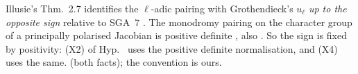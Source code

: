 \begin{remark}\label{rem:s05-illusie}
Illusie's Thm.~2.7 identifies the $\ell$-adic pairing with Grothendieck's $u_\ell$ \emph{up to the opposite sign} relative to SGA~7
. The
monodromy pairing on the character group of a principally polarised Jacobian is positive definite
, also
. So the sign is fixed by positivity: (X2) of
Hyp.~ uses the positive definite normalisation, and (X4) uses the same. \stcited{} (both facts); the convention
is ours.
\end{remark}

